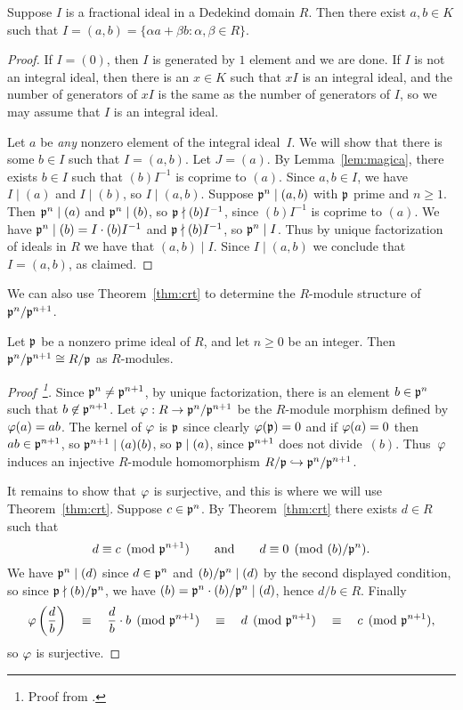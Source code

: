 \begin{proposition}\label{prop:2gen}
Suppose $I$ is a fractional ideal in a Dedekind domain $R$.  Then there exist $a,b\in{}K$ such that 
$I=(a,b)=\{\alpha a + \beta b : \alpha,\beta \in R\}$.
\end{proposition}
\begin{proof}
If $I=(0)$, then $I$ is generated by $1$ element and we are done.  If
$I$ is not an integral ideal, then there is an $x\in K$ such that $xI$ is
an integral ideal, and the number of generators of $xI$ is the same as
the number of generators of $I$, so we may assume that $I$ is an
integral ideal.  

Let $a$ be {\em any} nonzero element of the integral ideal~$I$.  We
will show that there is some $b\in I$ such that $I=(a,b)$.  Let
$J=(a)$.  By Lemma~\ref{lem:magica}, there exists $b\in I$ such that
$(b)I^{-1}$ is coprime to $(a)$.  Since $a,b\in I$, we have $I\mid
(a)$ and $I\mid (b)$, so $I\mid (a,b)$.  Suppose $\mathfrak{p}^n\mid (a,b)$ with
$\mathfrak{p}$ prime and $n\geq 1$.  Then $\mathfrak{p}^n\mid (a)$ and $\mathfrak{p}^n\mid (b)$, so
$\mathfrak{p}\nmid (b)I^{-1}$, since $(b)I^{-1}$ is coprime to $(a)$.  We have
$\mathfrak{p}^n\mid(b) = I\cdot (b)I^{-1}$ and $\mathfrak{p}\nmid (b)I^{-1}$, so $\mathfrak{p}^n
\mid I$.  Thus by unique factorization of ideals in $R$ we
have that $(a,b)\mid I$.  Since $I \mid (a,b)$ we conclude
that  $I=(a,b)$, as claimed.
\end{proof}

We can also use Theorem~\ref{thm:crt} to determine the
$R$-module structure of $\mathfrak{p}^n/\mathfrak{p}^{n+1}$.
\begin{proposition}\label{prop:quopow}
Let $\mathfrak{p}$ be a nonzero prime ideal of $R$, and let $n\geq 0$ be an
integer.  Then $\mathfrak{p}^n/\mathfrak{p}^{n+1} \cong R/\mathfrak{p}$ as $R$-modules.
\end{proposition}
\begin{proof}[Proof~\footnote{Proof from \cite[pg.~13]{sd:brief}.}]
Since $\mathfrak{p}^n\neq \mathfrak{p}^{n+1}$, by unique factorization, 
there is an element $b\in
\mathfrak{p}^n$ such that $b\not\in \mathfrak{p}^{n+1}$.  Let
$\varphi:R\to\mathfrak{p}^n/\mathfrak{p}^{n+1}$ be the $R$-module morphism defined by
$\varphi(a)=ab$.  The kernel of $\varphi$ is $\mathfrak{p}$ since clearly
$\varphi(\mathfrak{p})=0$ and if $\varphi(a)=0$ then $ab\in\mathfrak{p}^{n+1}$, so
$\mathfrak{p}^{n+1}\mid (a)(b)$, so $\mathfrak{p}\mid (a)$, since $\mathfrak{p}^{n+1}$ does not
divide~$(b)$.  Thus~$\varphi$ induces an injective $R$-module
homomorphism $R/\mathfrak{p}\hookrightarrow \mathfrak{p}^{n}/\mathfrak{p}^{n+1}$.

It remains to show that $\varphi$ is surjective, and this is where we
will use Theorem~\ref{thm:crt}.   Suppose $c\in \mathfrak{p}^{n}$.
By Theorem~\ref{thm:crt} there exists $d\in R$
such that
$$
  d \equiv c\pmod{\mathfrak{p}^{n+1}}
\qquad\text{and}\qquad
  d \equiv 0\pmod{(b)/\mathfrak{p}^{n}}.
$$
We have $\mathfrak{p}^n\mid (d)$ since $d\in\mathfrak{p}^n$ and $(b)/\mathfrak{p}^n\mid (d)$
by the second displayed condition, so 
since $\mathfrak{p}\nmid(b)/\mathfrak{p}^n$, we have $(b)=\mathfrak{p}^n\cdot(b)/\mathfrak{p}^n\mid (d)$, hence 
$d/b\in R$.   Finally
\[
 \varphi\left(\frac{d}{b}\right) \quad \equiv \quad \frac{d}{b}\cdot b \pmod{\mathfrak{p}^{n+1}} 
 \quad \equiv \quad d\pmod{\mathfrak{p}^{n+1}} \quad\equiv \quad c\pmod{\mathfrak{p}^{n+1}},
\]
so $\varphi$ is surjective.
\end{proof}

